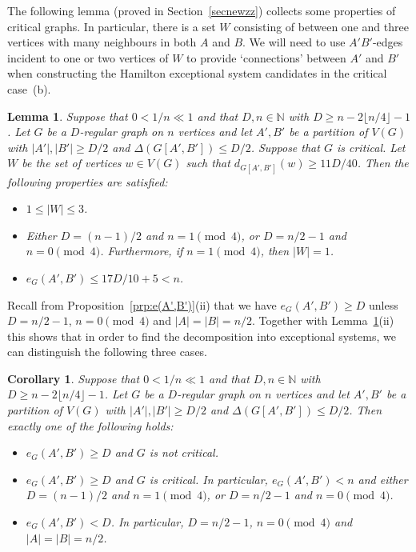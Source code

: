\documentclass{memo-l}
\newtheorem{lemma}[firstthm]{Lemma}
\newtheorem{cor}[firstthm]{Corollary}
\def\COMMENT#1{}
\numberwithin{section}{chapter}
\numberwithin{equation}{section}
\numberwithin{firstthm}{section}
\numberwithin{figure}{section}
\begin{document}
The following lemma (proved in Section~\ref{secnewzz}) collects some properties of critical graphs.
In particular, there is a set $W$ consisting of  between one and three vertices
with many neighbours in both $A$ and $B$. %
We will need to use $A'B'$-edges incident to one or two vertices of $W$
to provide `connections' between $A'$ and $B'$ when constructing 
the Hamilton exceptional system candidates in the critical case~(b).

\begin{lemma} \label{critical}
Suppose that $0< 1/n \ll 1$ and that $D, n \in \mathbb N$ with
$D\ge n - 2\lfloor n/4 \rfloor -1$.
Let $G$ be a $D$-regular graph on $n$ vertices and let $A',B'$ be a partition of $V(G)$ with $|A'| , |B'| \ge D/2$ and $\Delta(G[A',B']) \le D/2$.
Suppose that $G$ is critical.
Let $W$ be the set of vertices $w \in V(G)$ such that $d_{G[A',B']}(w) \ge 11D/40$.
Then the following properties are satisfied:
\begin{itemize}
	\item[$ \rm (i)$] $1 \le |W| \le 3$.
	\item[$ \rm (ii)$] Either $D = (n-1)/2$ and $n = 1 \pmod{4}$, or $D = n/2-1$ and $n = 0 \pmod{4}$.
	Furthermore, if $n =1 \pmod{4}$, then $|W|=1$.
	\item[$\rm (iii)$] $e_{G}(A',B') \le 17D/10+5 < n$.
\end{itemize}
\end{lemma}

Recall from Proposition~\ref{prp:e(A',B')}(ii) that we have $e_G(A',B') \ge D$ unless $D = n/2 - 1$, $n = 0 \pmod{4}$ and $|A| = |B| = n/2$.
Together with Lemma~\ref{critical}(ii) this shows that in order to find the decomposition into exceptional
systems, we can distinguish the following three cases.%
   \COMMENT{Daniela: previously had $|A'| \ge |B'| \ge D/2$ in the corollary}

\begin{cor}\label{cor:cases}
Suppose that $0< 1/n  \ll 1$ and that $D, n \in \mathbb N$ with $D \ge n - 2 \lfloor n/4 \rfloor -1$.
Let $G$ be a $D$-regular graph on $n$ vertices and let $A',B'$ be a partition of $V(G)$ with $|A'|,|B'| \ge D/2$ and $\Delta(G[A',B']) \le D/2$.
Then exactly one of the following holds:
\begin{itemize}
	\item[\rm (a)] $e_G(A',B') \ge D$ and $G$ is not critical.
	\item[\rm (b)] $e_G(A',B') \ge D$ and $G$ is critical. In particular, $e_G(A',B')< n$ and either $D = (n-1)/2$ and
$n = 1 \pmod{4}$, or $D = n/2-1$ and $n = 0 \pmod{4}$.
	\item[\rm (c)] $e_G(A',B') < D$. In particular, $D = n/2 - 1$, $n = 0 \pmod{4}$ and $|A| = |B| = n/2$.
\end{itemize}
\end{cor}
\end{document}
